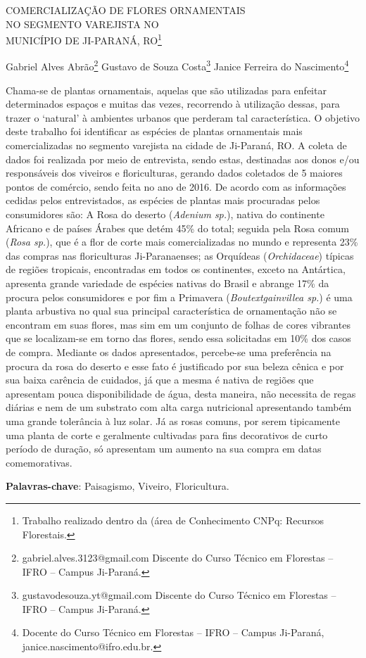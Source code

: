 \documentclass[article,12pt,onesidea,4paper,english,brazil]{abntex2}
\begin{document}
	
	
	\frenchspacing 
	
	\begin{center}
		\LARGE \MakeUppercase{Comercialização de flores ornamentais}\\ \MakeUppercase{no segmento varejista no}\\
		\MakeUppercase{município de Ji-Paraná, RO}\footnote{Trabalho realizado dentro da (área de Conhecimento CNPq: Recursos Florestais.}
		
		\normalsize
		Gabriel Alves Abrão\footnote{gabriel.alves.3123@gmail.com Discente do Curso Técnico em Florestas – IFRO – Campus
			Ji-Paraná.} 
	Gustavo de Souza Costa\footnote{gustavodesouza.yt@gmail.com Discente do Curso Técnico em Florestas – IFRO – Campus
		Ji-Paraná.} 
	Janice Ferreira do Nascimento\footnote{Docente do Curso Técnico em Florestas – IFRO – Campus Ji-Paraná,
		janice.nascimento@ifro.edu.br.} 
	
	\end{center}
	
	\noindent Chama-se de plantas ornamentais, aquelas que são utilizadas para enfeitar determinados
	espaços e muitas das vezes, recorrendo à utilização dessas, para trazer o ‘natural’ à ambientes
	urbanos que perderam tal característica. O objetivo deste trabalho foi identificar as espécies de
	plantas ornamentais mais comercializadas no segmento varejista na cidade de Ji-Paraná, RO.
	A coleta de dados foi realizada por meio de entrevista, sendo estas, destinadas aos donos e/ou
	responsáveis dos viveiros e floriculturas, gerando dados coletados de 5 maiores pontos de
	comércio, sendo feita no ano de 2016. De acordo com as informações cedidas pelos
	entrevistados, as espécies de plantas mais procuradas pelos consumidores são: A Rosa do
	deserto (\textit{Adenium sp.}), nativa do continente Africano e de países Árabes que detém 45\% do
	total; seguida pela Rosa comum (\textit{Rosa sp.}), que é a flor de corte mais comercializadas no
	mundo e representa 23\% das compras nas floriculturas Ji-Paranaenses; as Orquídeas
	(\textit{Orchidaceae}) típicas de regiões tropicais, encontradas em todos os continentes, exceto na
	Antártica, apresenta grande variedade de espécies nativas do Brasil e abrange 17\% da procura
	pelos consumidores e por fim a Primavera (\textit{Boutextgainvillea sp.}) é uma planta arbustiva no qual
	sua principal característica de ornamentação não se encontram em suas flores, mas sim em
	um conjunto de folhas de cores vibrantes que se localizam-se em torno das flores, sendo essa
	solicitadas em 10\% dos casos de compra. Mediante os dados apresentados, percebe-se uma
	preferência na procura da rosa do deserto e esse fato é justificado por sua beleza cênica e por
	sua baixa carência de cuidados, já que a mesma é nativa de regiões que apresentam pouca
	disponibilidade de água, desta maneira, não necessita de regas diárias e nem de um substrato
	com alta carga nutricional apresentando também uma grande tolerância à luz solar. Já as rosas
	comuns, por serem tipicamente uma planta de corte e geralmente cultivadas para fins
	decorativos de curto período de duração, só apresentam um aumento na sua compra em datas
	comemorativas.
	
	\vspace{\onelineskip}
	
	\noindent
	\textbf{Palavras-chave}: Paisagismo, Viveiro, Floricultura.
	
\end{document}
